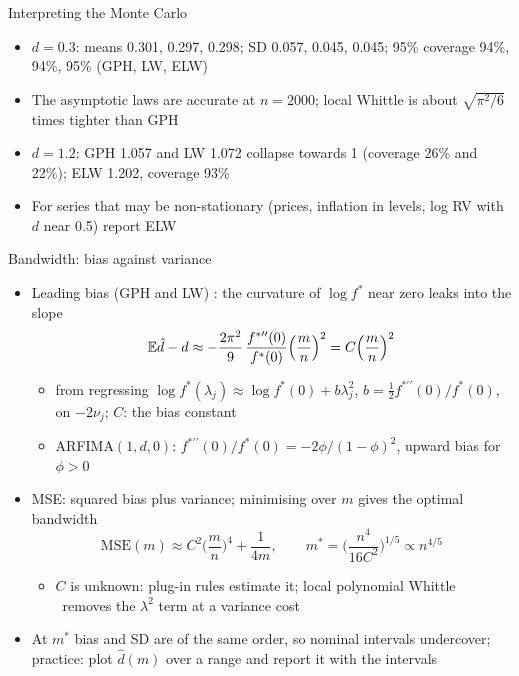 \begin{frame}{Interpreting the Monte Carlo}
\itemsize{\small}
\begin{itemize}
    \item $d = 0.3$: means 0.301, 0.297, 0.298; SD 0.057, 0.045, 0.045; 95\% coverage 94\%, 94\%, 95\% (GPH, LW, ELW)
    \item The asymptotic laws are accurate at $n = 2000$; local Whittle is about $\sqrt{\pi^2/6}$ times tighter than GPH
    \item $d = 1.2$: GPH 1.057 and LW 1.072 collapse towards 1 (coverage 26\% and 22\%); ELW 1.202, coverage 93\%
    \item For series that may be non-stationary (prices, inflation in levels, log RV with $d$ near 0.5) report ELW
\end{itemize}
\end{frame}

\begin{frame}{Bandwidth: bias against variance}
\itemsize{\small}
\begin{itemize}
    \item Leading bias (GPH and LW) : the curvature of $\log f^*$ near zero leaks into the slope
    \[ \mathbb{E}\hat d - d \approx -\frac{2\pi^2}{9}\,\frac{f^{*\prime\prime}(0)}{f^*(0)}\Big(\frac mn\Big)^2 = C\Big(\frac mn\Big)^2 \]
    \begin{itemize}
        \item from regressing $\log f^*(\lambda_j) \approx \log f^*(0) + b\lambda_j^2$, $b = \tfrac12f^{*\prime\prime}(0)/f^*(0)$, on $-2\nu_j$; $C$: the bias constant
        \item ARFIMA$(1,d,0)$: $f^{*\prime\prime}(0)/f^*(0) = -2\phi/(1 - \phi)^2$, upward bias for $\phi > 0$
    \end{itemize}
    \item MSE: squared bias plus variance; minimising over $m$ gives the optimal bandwidth 
    \[ \mathrm{MSE}(m) \approx C^2\Big(\frac mn\Big)^4 + \frac{1}{4m}, \qquad m^* = \Big(\frac{n^4}{16C^2}\Big)^{1/5} \propto n^{4/5} \]
    \begin{itemize}
        \item $C$ is unknown: plug-in rules estimate it; local polynomial Whittle \ removes the $\lambda^2$ term at a variance cost
    \end{itemize}
    \item At $m^*$ bias and SD are of the same order, so nominal intervals undercover; practice: plot $\hat d(m)$ over a range and report it with the intervals
\end{itemize}
\end{frame}

